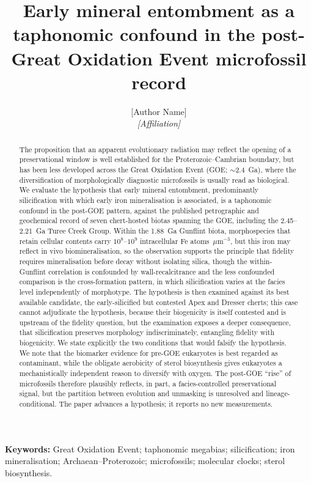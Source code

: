 \documentclass[11pt]{article}
\title{\vspace{-1.0cm}\textbf{Early mineral entombment as a taphonomic confound in the
post-Great Oxidation Event microfossil record}}
\author{[Author Name]\\
\small\textit{[Affiliation]}}
\date{}
\begin{document}
\maketitle

\begin{abstract}
\noindent The proposition that an apparent evolutionary radiation may reflect the opening of a
preservational window is well established for the Proterozoic--Cambrian boundary, but has been less
developed across the Great Oxidation Event (GOE; $\sim$2.4~Ga), where the diversification of
morphologically diagnostic microfossils is usually read as biological. We evaluate the hypothesis
that early mineral entombment, predominantly silicification with which early iron mineralisation is
associated, is a taphonomic confound in the post-GOE pattern, against the published petrographic and
geochemical record of seven chert-hosted biotas spanning the GOE, including the 2.45--2.21~Ga Turee
Creek Group. Within the 1.88~Ga Gunflint biota, morphospecies that retain cellular contents carry
$10^{8}$--$10^{9}$ intracellular Fe atoms~$\mu$m$^{-3}$, but this iron may reflect in vivo
biomineralisation, so the observation supports the principle that fidelity requires mineralisation
before decay without isolating silica, though the within-Gunflint correlation is confounded by
wall-recalcitrance and the less confounded comparison is the cross-formation pattern, in which silicification
varies at the facies level independently of morphotype. The hypothesis is then examined against its
best available candidate, the early-silicified but contested Apex and Dresser cherts; this case
cannot adjudicate the hypothesis, because their biogenicity is itself contested and is upstream of
the fidelity question, but the examination exposes a deeper consequence, that silicification
preserves morphology indiscriminately, entangling fidelity with biogenicity. We state explicitly
the two conditions that would falsify the hypothesis. We note that the biomarker evidence for pre-GOE eukaryotes is best regarded as
contaminant, while the obligate aerobicity of sterol biosynthesis gives eukaryotes a
mechanistically independent reason to diversify with oxygen. The post-GOE ``rise'' of microfossils
therefore plausibly reflects, in part, a facies-controlled preservational signal, but the partition
between evolution and unmasking is unresolved and lineage-conditional. The paper advances a
hypothesis; it reports no new measurements.
\end{abstract}

\noindent\textbf{Keywords:} Great Oxidation Event; taphonomic megabias; silicification; iron
mineralisation; Archaean--Proterozoic; microfossils; molecular clocks; sterol biosynthesis.
\end{document}
